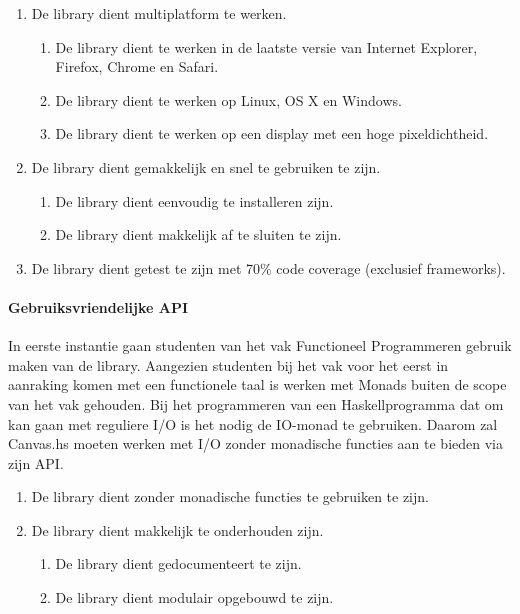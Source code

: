 \begin{enumerate}[label={R\arabic*}]
\setcounter{enumi}{\value{startvalue}}
	\item \label{req:multiplatform} De library dient multiplatform te werken.
	\begin{enumerate}[label={R\arabic{enumi}.\arabic*}]
		\item De library dient te werken in de laatste versie van Internet Explorer, Firefox, Chrome en Safari.
		\item De library dient te werken op Linux, OS X en Windows.
		\item De library dient te werken op een display met een hoge pixeldichtheid.
	\end{enumerate}
	\item \label{req:performance} De library dient gemakkelijk en snel te gebruiken te zijn.
	\begin{enumerate}[label={R\arabic{enumi}.\arabic*}]
		\item De library dient eenvoudig te installeren zijn.
		\item De library dient makkelijk af te sluiten te zijn.
	\end{enumerate}
	\item \label{req:coverage} De library dient getest te zijn met 70\% code coverage (exclusief frameworks).
	\setcounter{startvalue}{\value{enumi}}
\end{enumerate}

\paragraph{Gebruiksvriendelijke API}
In eerste instantie gaan studenten van het vak Functioneel Programmeren gebruik maken van de library. Aangezien studenten bij het vak voor het eerst in aanraking komen met een functionele taal is werken met Monads buiten de scope van het vak gehouden. Bij het programmeren van een Haskellprogramma dat om kan gaan met reguliere I/O is het nodig de IO-monad te gebruiken. Daarom zal Canvas.hs moeten werken met I/O zonder monadische functies aan te bieden via zijn API.

\begin{enumerate}[label={R\arabic*}]
\setcounter{enumi}{\value{startvalue}}
		\item \label{req:monadisch} De library dient zonder monadische functies te gebruiken te zijn.
		\item \label{req:maintenance} De library dient makkelijk te onderhouden zijn.
		\begin{enumerate}[label={R\arabic{enumi}.\arabic*}]
			\item De library dient gedocumenteert te zijn.
			\item De library dient modulair opgebouwd te zijn.
		\end{enumerate}
	\setcounter{startvalue}{\value{enumi}}
\end{enumerate}